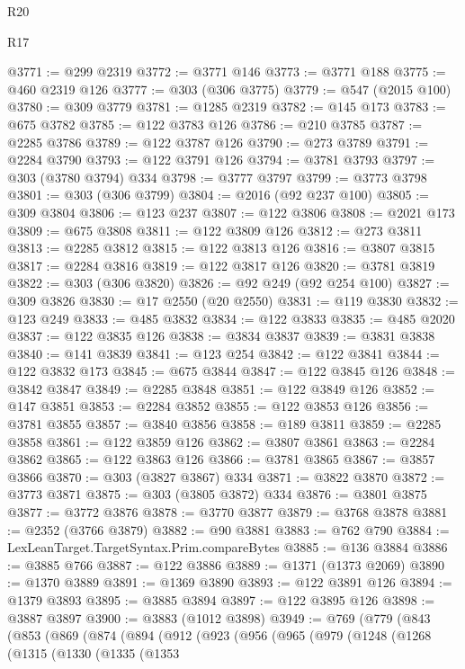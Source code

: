 \begin{lexlean}{R20}
\begin{lexlean}{R17}
\begin{coremodule}
{{{{{{{{{{{{{{{{{{{{{{{{{{{{{{{{{{{{{{{{{{{{{{{{{{{{{{{{{{{{{{{{{{{{{{{{{{{{{{{{{{{{{{{{{{{{{{{{{{{{{{{{{{{@3771 := @299 @2319
@3772 := @3771 @146
@3773 := @3771 @188
@3775 := @460 @2319 @126
@3777 := @303 (@306 @3775)
@3779 := @547 (@2015 @100)
@3780 := @309 @3779
@3781 := @1285 @2319
@3782 := @145 @173
@3783 := @675 @3782
@3785 := @122 @3783 @126
@3786 := @210 @3785
@3787 := @2285 @3786
@3789 := @122 @3787 @126
@3790 := @273 @3789
@3791 := @2284 @3790
@3793 := @122 @3791 @126
@3794 := @3781 @3793
@3797 := @303 (@3780 @3794) @334
@3798 := @3777 @3797
@3799 := @3773 @3798
@3801 := @303 (@306 @3799)
@3804 := @2016 (@92 @237 @100)
@3805 := @309 @3804
@3806 := @123 @237
@3807 := @122 @3806
@3808 := @2021 @173
@3809 := @675 @3808
@3811 := @122 @3809 @126
@3812 := @273 @3811
@3813 := @2285 @3812
@3815 := @122 @3813 @126
@3816 := @3807 @3815
@3817 := @2284 @3816
@3819 := @122 @3817 @126
@3820 := @3781 @3819
@3822 := @303 (@306 @3820)
@3826 := @92 @249 (@92 @254 @100)
@3827 := @309 @3826
@3830 := @17 @2550 (@20 @2550)
@3831 := @119 @3830
@3832 := @123 @249
@3833 := @485 @3832
@3834 := @122 @3833
@3835 := @485 @2020
@3837 := @122 @3835 @126
@3838 := @3834 @3837
@3839 := @3831 @3838
@3840 := @141 @3839
@3841 := @123 @254
@3842 := @122 @3841
@3844 := @122 @3832 @173
@3845 := @675 @3844
@3847 := @122 @3845 @126
@3848 := @3842 @3847
@3849 := @2285 @3848
@3851 := @122 @3849 @126
@3852 := @147 @3851
@3853 := @2284 @3852
@3855 := @122 @3853 @126
@3856 := @3781 @3855
@3857 := @3840 @3856
@3858 := @189 @3811
@3859 := @2285 @3858
@3861 := @122 @3859 @126
@3862 := @3807 @3861
@3863 := @2284 @3862
@3865 := @122 @3863 @126
@3866 := @3781 @3865
@3867 := @3857 @3866
@3870 := @303 (@3827 @3867) @334
@3871 := @3822 @3870
@3872 := @3773 @3871
@3875 := @303 (@3805 @3872) @334
@3876 := @3801 @3875
@3877 := @3772 @3876
@3878 := @3770 @3877
@3879 := @3768 @3878
@3881 := @2352 (@3766 @3879)
@3882 := @90 @3881
@3883 := @762 @790
@3884 := LexLeanTarget.TargetSyntax.Prim.compareBytes
@3885 := @136 @3884
@3886 := @3885 @766
@3887 := @122 @3886
@3889 := @1371 (@1373 @2069)
@3890 := @1370 @3889
@3891 := @1369 @3890
@3893 := @122 @3891 @126
@3894 := @1379 @3893
@3895 := @3885 @3894
@3897 := @122 @3895 @126
@3898 := @3887 @3897
@3900 := @3883 (@1012 @3898)
@3949 := @769
    (@779
      (@843
        (@853
          (@869
            (@874
              (@894
                (@912
                  (@923
                    (@956
                      (@965
                        (@979
                          (@1248
                            (@1268
                              (@1315
                                (@1330
                                  (@1335
                                    (@1353
}}}}}}}}}}}}}}}}}}}}}}}}}}}}}}}}}}}}}}}}}}}}}}}}}}}}}}}}}}}}}}}}}}}}}}}}}}}}}}}}}}}}}}}}}}}}}}}}}}}}}}}}}}}
\end{coremodule}
\end{lexlean}
\end{lexlean}
